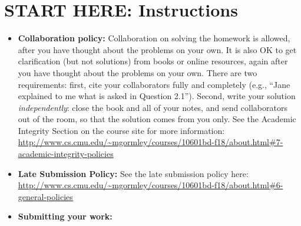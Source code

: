 \documentclass[12pt]{article}
\begin{document}
\section*{START HERE: Instructions}
\begin{itemize}
\item \textbf{Collaboration policy:} Collaboration on solving the homework is allowed, after you have thought about the problems on your own. It is also OK to get clarification (but not solutions) from books or online resources, again after you have thought about the problems on your own. There are two requirements: first, cite your collaborators fully and completely (e.g., ``Jane explained to me what is asked in Question 2.1''). Second, write your solution {\em independently}: close the book and all of your notes, and send collaborators out of the room, so that the solution comes from you only.  See the Academic Integrity Section on the course site for more information: \url{http://www.cs.cmu.edu/~mgormley/courses/10601bd-f18/about.html#7-academic-integrity-policies}

\item\textbf{Late Submission Policy:} See the late submission policy here: \url{http://www.cs.cmu.edu/~mgormley/courses/10601bd-f18/about.html#6-general-policies}

\item\textbf{Submitting your work:} 

\begin{itemize}



\end{itemize}
\end{itemize}
\end{document}
